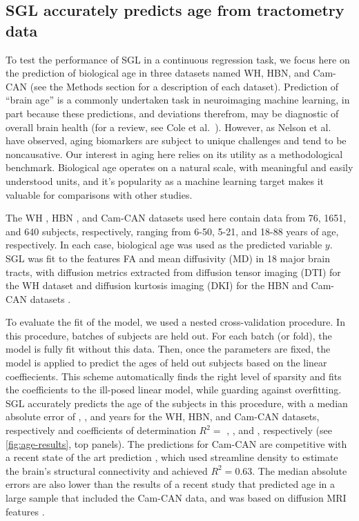\documentclass[10pt,letterpaper]{article}
\begin{document}
\subsection*{SGL accurately predicts age from tractometry data}

To test the performance of SGL  in a continuous
regression task, we focus here on the prediction of biological age in three
datasets named WH, HBN, and Cam-CAN (see the Methods section for a description of each dataset). Prediction of ``brain
age'' is a commonly undertaken task in neuroimaging machine learning, in part
because these predictions, and deviations therefrom, may be diagnostic of
overall brain health (for a review, see Cole et al.~\cite{Cole2019-rz}).
However, as Nelson et al.~\cite{nelson2019biomarkers} have observed, aging
biomarkers are subject to unique challenges and tend to be noncausative. Our
interest in aging here relies on its utility as a methodological benchmark.
Biological age operates on a natural scale, with meaningful and easily
understood units, and it's popularity as a machine learning target makes it
valuable for comparisons with other studies.

The WH \cite{yeatman2014lifespan}, HBN \cite{alexander2017open}, and Cam-CAN
\cite{shafto2014cambridge,taylor2017cambridge} datasets used here contain
data from 76, 1651, and 640 subjects, respectively, ranging from 6-50, 5-21,
and 18-88 years of age, respectively. In each case, biological age was used
as the predicted variable $y$. SGL was fit to the 
features FA and mean diffusivity (MD) in 18 major brain tracts, with diffusion metrics extracted
from diffusion tensor imaging (DTI) for the WH dataset and diffusion kurtosis
imaging (DKI) \cite{jensen2005diffusion} for the HBN and Cam-CAN datasets .

To evaluate the fit of the model, we used a nested cross-validation
procedure. In this procedure, batches of subjects are held out. For each
batch (or fold), the model is fully fit without this data. Then, once the
parameters are fixed, the model is applied to predict the ages of held out
subjects based on the linear coeffiecients. This scheme automatically finds
the right level of sparsity and fits the coefficients to the ill-posed linear
model, while guarding against overfitting. SGL accurately predicts the age of
the subjects in this procedure, with a median absolute error of {\whMae},
\added{{\hbnMae}}, and {\camcanMae} years for the WH, HBN, and Cam-CAN datasets,
respectively and coefficients of determination $R^2 = $ {\whRsq} , \added{{\hbnRsq}}, and {\camcanRsq},
respectively (see \cref{fig:age-results}, top panels). The
predictions for Cam-CAN are competitive with a recent state of the art
prediction \cite{mcpherson2020single}, which used streamline density to
estimate the brain's structural connectivity and achieved $R^2 = 0.63$. The
median absolute errors are also lower than the results of a recent study that
predicted age in a large sample that included the Cam-CAN data, and was based
on diffusion MRI features \cite{Richard2018-ux}.
\end{document}
